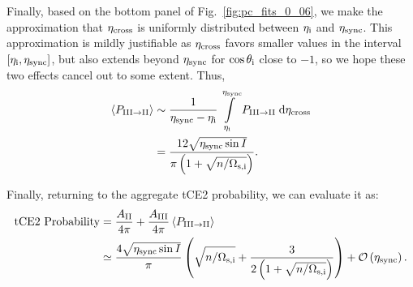 \documentclass[
        fleqn,
        usenatbib,
    ]{mnras}
\newcommand*{\ev}[1]{\left\langle#1\right\rangle}
\newcommand*{\p}[1]{\left(#1\right)}
\newcommand*{\s}[1]{\left[#1\right]}
\begin{document}
Finally, based on the bottom panel of Fig.~\ref{fig:pc_fits_0_06}, we make the
approximation that $\eta_{\rm cross}$ is uniformly distributed between
$\eta_{\rm i}$ and $\eta_{\rm sync}$. This approximation is mildly justifiable
as $\eta_{\rm cross}$ favors smaller values in the interval $\s{\eta_{\rm i},
\eta_{\rm sync}}$, but also extends beyond $\eta_{\rm sync}$ for $\cos
\theta_{\rm i}$ close to $-1$, so we hope these two effects cancel out to some
extent. Thus,
\begin{align}
    \ev{P_{\rm III \to II}}
        &\sim \frac{1}{\eta_{\rm sync} - \eta_{\rm i}}
            \int\limits_{\eta_{\rm i}}^{\eta_{\rm sync}}
            P_{\rm III \to II}\;\mathrm{d}\eta_{\rm cross}\nonumber\\
        &= \frac{12 \sqrt{\eta_{\rm sync}\sin I}}{\pi
            \p{1 + \sqrt{n / \Omega_{\rm s, i}}}}.
\end{align}

Finally, returning to the aggregate tCE2 probability, we can evaluate it as:
\begin{align}
    \text{tCE2 Probability}
        &= \frac{A_{\rm II}}{4\pi}
            + \frac{A_{\rm III}}{4\pi}\ev{P_{\rm III \to II}}\nonumber\\
        &\simeq
            \frac{4\sqrt{\eta _{\rm sync} \sin I}}{\pi}\p{
                \sqrt{n / \Omega_{\rm s, i}}
                + \frac{3}{2\p{1
                + \sqrt{n / \Omega_{\rm s, i}}}}}
            + \mathcal{O}\p{\eta_{\rm sync}}.\label{eq:app_tce2_p_tot}
\end{align}

\label{lastpage} %
\end{document}
